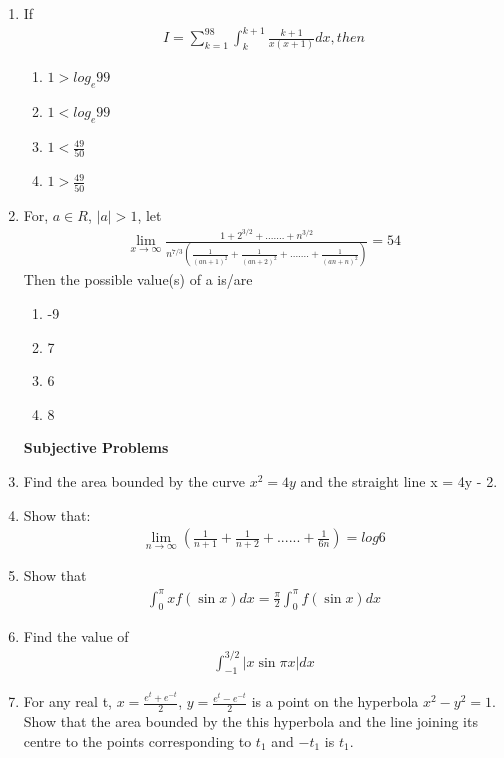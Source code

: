 \begin{enumerate}[label=\arabic*.,ref=\thesubsection.\theenumi]
\item If 
\begin{align*}
I = \sum_{k = 1}^{98}\int_{k}^{k + 1}\frac{k + 1}{x(x + 1)}dx, then
\end{align*}
\begin{enumerate}
\item $1 > log_e99$
\item $1 < log_e99$
\item $1 < \frac{49}{50}$
\item $1 > \frac{49}{50}$
\end{enumerate}

\item For, $a \in R$, $|a| > 1$, let
\begin{align*}
\lim_{x \to \infty}\frac{1 + 2^{3/2} + .......+ n^{3/2}}{n^{7/3}(\frac{1}{(an + 1)^2} + \frac{1}{(an + 2)^2}+.......+\frac{1}{(an + n)^2})} = 54
\end{align*}
Then the possible value(s) of a is/are
\begin{enumerate}
\item -9
\item 7
\item 6
\item 8
\end{enumerate}

\textbf{Subjective Problems}

\item Find the area bounded by the curve $x^2 = 4y$ and the straight line x = 4y - 2.

\item Show that:
\begin{align*}
\lim_{n \to \infty}(\frac{1}{n + 1} + \frac{1}{n + 2}+......+\frac{1}{6n}) = log 6
\end{align*}

\item Show that
\begin{align*}
\int_{0}^{\pi}xf(\sin x)dx = \frac{\pi}{2}\int_{0}^{\pi}f(\sin x)dx
\end{align*}

\item Find the value of
\begin{align*}
\int_{-1}^{3/2}|x \sin \pi x|dx
\end{align*}

\item For any real t, $x = \frac{e^t + e^{-t}}{2}$, $y = \frac{e^t - e^{-t}}{2}$ is a point on the hyperbola $x^2 - y^2 = 1$. Show that the area bounded by the this hyperbola and the line joining its centre to the points corresponding to $t_1$ and $-t_1$ is $t_1$.


\end{enumerate}
